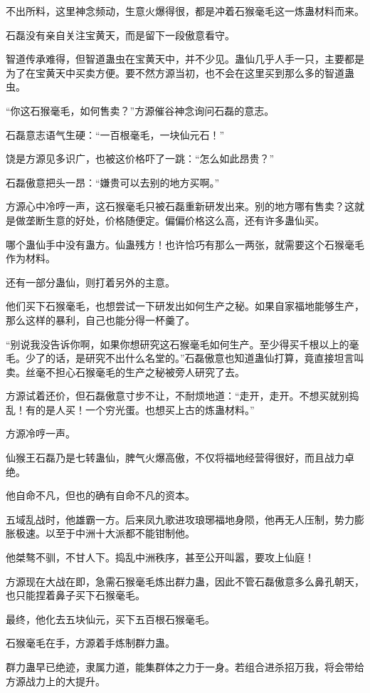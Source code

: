 \begin{this_body}
不出所料，这里神念频动，生意火爆得很，都是冲着石猴毫毛这一炼蛊材料而来。

石磊没有亲自关注宝黄天，而是留下一段傲意看守。

智道传承难得，但智道蛊虫在宝黄天中，并不少见。蛊仙几乎人手一只，主要都是为了在宝黄天中买卖方便。要不然方源当初，也不会在这里买到那么多的智道蛊虫。

“你这石猴毫毛，如何售卖？”方源催谷神念询问石磊的意志。

石磊意志语气生硬：“一百根毫毛，一块仙元石！”

饶是方源见多识广，也被这价格吓了一跳：“怎么如此昂贵？”

石磊傲意把头一昂：“嫌贵可以去别的地方买啊。”

方源心中冷哼一声，这石猴毫毛只被石磊重新研发出来。别的地方哪有售卖？这就是做垄断生意的好处，价格随便定。偏偏价格这么高，还有许多蛊仙买。

哪个蛊仙手中没有蛊方。仙蛊残方！也许恰巧有那么一两张，就需要这个石猴毫毛作为材料。

还有一部分蛊仙，则打着另外的主意。

他们买下石猴毫毛，也想尝试一下研发出如何生产之秘。如果自家福地能够生产，那么这样的暴利，自己也能分得一杯羹了。

“别说我没告诉你啊，如果你想研究这石猴毫毛如何生产。至少得买千根以上的毫毛。少了的话，是研究不出什么名堂的。”石磊傲意也知道蛊仙打算，竟直接坦言叫卖。丝毫不担心石猴毫毛的生产之秘被旁人研究了去。

方源试着还价，但石磊傲意寸步不让，不耐烦地道：“走开，走开。不想买就别捣乱！有的是人买！一个穷光蛋。也想买上古的炼蛊材料。”

方源冷哼一声。

仙猴王石磊乃是七转蛊仙，脾气火爆高傲，不仅将福地经营得很好，而且战力卓绝。

他自命不凡，但也的确有自命不凡的资本。

五域乱战时，他雄霸一方。后来凤九歌进攻琅琊福地身陨，他再无人压制，势力膨胀极速。以至于中洲十大派都不能钳制他。

他桀骜不驯，不甘人下。捣乱中洲秩序，甚至公开叫嚣，要攻上仙庭！

方源现在大战在即，急需石猴毫毛炼出群力蛊，因此不管石磊傲意多么鼻孔朝天，也只能捏着鼻子买下石猴毫毛。

最终，他化去五块仙元，买下五百根石猴毫毛。

石猴毫毛在手，方源着手炼制群力蛊。

群力蛊早已绝迹，隶属力道，能集群体之力于一身。若组合进杀招万我，将会带给方源战力上的大提升。


\end{this_body}
